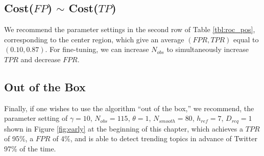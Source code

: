 \subsection{Cost($FP$) $\sim$ Cost($TP$)}
We recommend the parameter settings in the second row of Table
\ref{tbl:roc_pos}, corresponding to the center region, which give an average
$(FPR,TPR)$ equal to $(0.10,0.87)$. For fine-tuning, we can increase $N_{obs}$
to simultaneously increase $TPR$ and decrease $FPR$.

\subsection{Out of the Box}
Finally, if one wishes to use the algorithm ``out of the box,'' we recommend,
the parameter setting of $\gamma=10$, $N_{obs} =115$, $\theta = 1$,
$N_{smooth}=80$, $h_{ref} = 7$, $D_{req}=1$ shown in Figure \ref{fig:early} at
the beginning of this chapter, which achieves a $TPR$ of 95\%, a $FPR$ of 4\%,
and is able to detect trending topics in advance of Twitter 97\% of the time.
